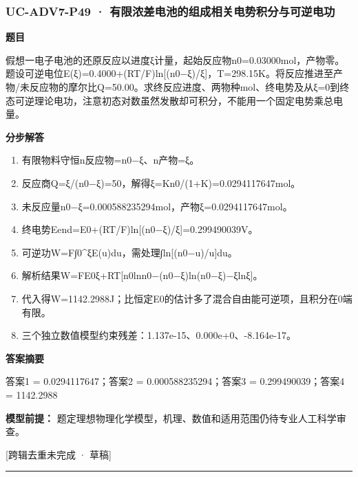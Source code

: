 \documentclass[UTF8,11pt,a4paper]{ctexart}
\begin{document}
\subsubsection*{UC-ADV7-P49 · 有限浓差电池的组成相关电势积分与可逆电功}
\noindent\textbf{题目}\par
假想一电子电池的还原反应以进度ξ计量，起始反应物n0=0.03000mol，产物零。题设可逆电位E(ξ)=0.4000+(RT/F)ln[(n0−ξ)/ξ]，T=298.15K。将反应推进至产物/未反应物的摩尔比Q=50.00。求终反应进度、两物种mol、终电势及从ξ=0到终态可逆理论电功，注意初态对数虽然发散却可积分，不能用一个固定电势乘总电量。\par
\medskip\noindent\textbf{分步解答}
\begin{enumerate}
\item 有限物料守恒n反应物=n0−ξ、n产物=ξ。
\item 反应商Q=ξ/(n0−ξ)=50，解得ξ=Kn0/(1+K)=0.0294117647mol。
\item 未反应量n0−ξ=0.000588235294mol，产物ξ=0.0294117647mol。
\item 终电势Eend=E0+(RT/F)ln[(n0−ξ)/ξ]=0.299490039V。
\item 可逆功W=F∫0\textasciicircum{}ξE(u)du，需处理∫ln[(n0−u)/u]du。
\item 解析结果W=FE0ξ+RT[n0lnn0−(n0−ξ)ln(n0−ξ)−ξlnξ]。
\item 代入得W=1142.2988J；比恒定E0的估计多了混合自由能可逆项，且积分在0端有限。
\item 三个独立数值模型约束残差：1.137e-15、0.000e+0、-8.164e-17。
\end{enumerate}
\noindent\textbf{答案摘要}\par
答案1 = 0.0294117647；答案2 = 0.000588235294；答案3 = 0.299490039；答案4 = 1142.2988\par
\noindent\textbf{模型前提：}
题定理想物理化学模型，机理、数值和适用范围仍待专业人工科学审查。\par
\noindent\textcolor{red!65!black}{[跨辑去重未完成 · 草稿]} \par
\medskip\hrule\medskip
{}
\end{document}
